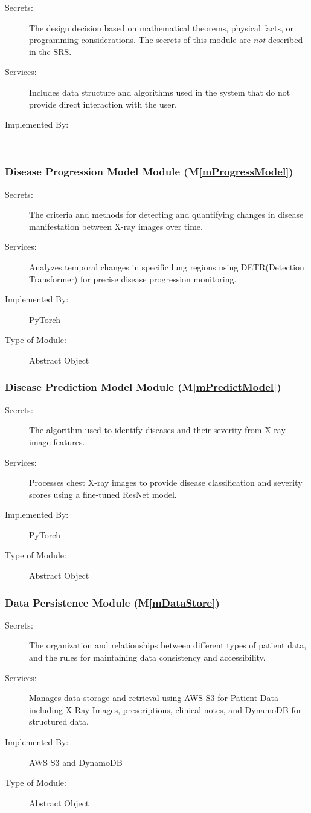 \documentclass[12pt, titlepage]{article}
\newcommand{\mref}[1]{M\ref{#1}}
\begin{document}
\begin{description}
\item[Secrets:] The design decision based on mathematical theorems, physical
  facts, or programming considerations. The secrets of this module are
  \emph{not} described in the SRS.
\item[Services:] Includes data structure and algorithms used in the system that
  do not provide direct interaction with the user. 
\item[Implemented By:] --
\end{description}

\subsubsection{Disease Progression Model Module (\mref{mProgressModel})}
\begin{description}
\item[Secrets:] The criteria and methods for detecting and quantifying changes in disease manifestation between X-ray images over time.
\item[Services:] Analyzes temporal changes in specific lung regions using DETR(Detection Transformer) for precise disease progression monitoring.
\item[Implemented By:] PyTorch
\item[Type of Module:] Abstract Object
\end{description}

\subsubsection{Disease Prediction Model Module (\mref{mPredictModel})}
\begin{description}
\item[Secrets:] The algorithm used to identify diseases and their severity from X-ray image features.
\item[Services:] Processes chest X-ray images to provide disease classification and severity scores using a fine-tuned ResNet model.
\item[Implemented By:] PyTorch
\item[Type of Module:] Abstract Object
\end{description}

\subsubsection{Data Persistence Module (\mref{mDataStore})}
\begin{description}
\item[Secrets:] The organization and relationships between different types of patient data, and the rules for maintaining data consistency and accessibility.
\item[Services:] Manages data storage and retrieval using AWS S3 for Patient Data including X-Ray Images, prescriptions, clinical notes, and DynamoDB for structured data.
\item[Implemented By:] AWS S3 and DynamoDB
\item[Type of Module:] Abstract Object
\end{description}
\end{document}
